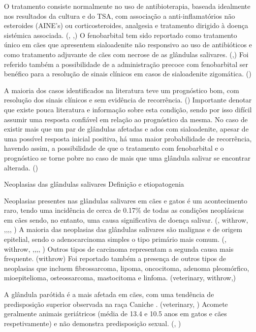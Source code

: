 O tratamento consiste normalmente no uso de antibioterapia, baseada idealmente nos resultados da cultura e do TSA, com associação a anti-inflamatórios não esteroides (AINE’s) ou corticosteroides, analgesia e tratamento dirigido à doença sistémica associada. (\cite{Park2022}, \cite{Enache2025},\cite{sialadenite}) O fenobarbital tem sido reportado como tratamento único em cães que apresentem sialoadenite não responsivo ao uso de antibióticos e como tratamento adjuvante de cães com necrose de as glândulas salivares. (\cite{Park2022},\cite{Enache2025}) Foi referido também a possibilidade de a administração precoce com fenobarbital ser benéfico para a resolução de sinais clínicos em casos de sialoadenite zigomática. (\cite{Martinez2018})


A maioria dos casos identificados na literatura teve um prognóstico bom, com resolução dos sinais clínicos e sem evidência de recorrência. (\cite{sialadenite}) Importante denotar que existe pouca literatura e informação sobre esta condição, sendo por isso difícil assumir uma resposta confiável em relação ao prognóstico da mesma.   
No caso de existir mais que um par de glândulas afetadas e \cite{Kumar2017}ados com sialoadenite, apesar de uma possível resposta inicial positiva, há uma maior probabilidade de recorrência, havendo assim, a possibilidade de que o tratamento com fenobarbital e o prognóstico se torne pobre no caso de mais que uma glândula salivar se encontrar alterada. (\cite{Park2022})

  
Neoplasias das glândulas salivares
Definição e etiopatogenia


Neoplasias presentes nas glândulas salivares em cães e gatos é um acontecimento raro, tendo uma incidência de cerca de 0.17\% de todas as condições neoplásicas em cães sendo, no entanto, uma causa significativa de doença salivar. (\cite{Almeida2010}, withrow, \cite{Oshikata2006},\cite{tsobrev},\cite{campos2019},\cite{Cray2020}, \cite{de2020}) A maioria das neoplasias das glândulas salivares são malignas e de origem epitelial, sendo o adenocarcinoma simples o tipo primário mais comum. (\cite{Almeida2010}, withrow, \cite{Oshikata2006},\cite{tsobrev},\cite{campos2019},\cite{Cray2020}, \cite{de2020}) Outros tipos de carcinoma representam a segunda causa mais frequente. (withrow) Foi reportado também a presença de outros tipos de neoplasias que incluem fibrossarcoma, lipoma, oncocitoma, adenoma pleomórfico, mioepitelioma, osteossarcoma, mastocitoma e linfoma. (veterinary, withrow,\cite{Cray2020})


A glândula parótida é a mais afetada em cães, com uma tendência de predisposição superior  observada na raça Caniche . (veterinary, \cite{Oshikata2006}) Acomete geralmente animais geriátricos (média de 13.4 e 10.5 anos em gatos e cães respetivamente) e não demonstra predisposição sexual. (\cite{Cray2020}, \cite{de2020})


